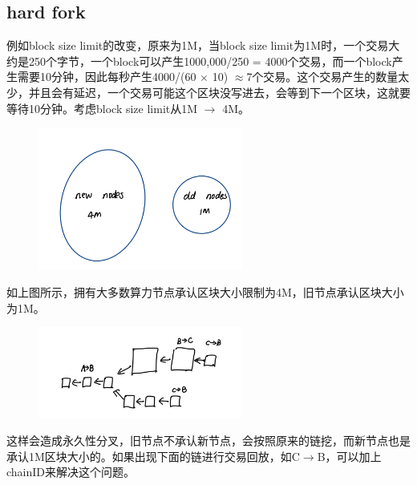 \documentclass[10pt]{ctexart}
\begin{document}
\subsection{hard fork}
例如block size limit的改变，原来为1M，当block size limit为1M时，一个交易大约是250个字节，一个block可以产生1000,000/250 = 4000个交易，而一个block产生需要10分钟，因此每秒产生4000/(60 $\times$ 10) $\approx $7个交易。这个交易产生的数量太少，并且会有延迟，一个交易可能这个区块没写进去，会等到下一个区块，这就要等待10分钟。考虑block size limit从1M $\rightarrow$ 4M。
\begin{figure}[H]
    \centering
    \includegraphics[width=0.6\textwidth]{./lecture10/img1.png} 
\end{figure}
如上图所示，拥有大多数算力节点承认区块大小限制为4M，旧节点承认区块大小为1M。
\begin{figure}[H]
    \centering
    \includegraphics[width=0.6\textwidth]{./lecture10/img2.png} 
\end{figure}
这样会造成永久性分叉，旧节点不承认新节点，会按照原来的链挖，而新节点也是承认1M区块大小的。如果出现下面的链进行交易回放，如C$\rightarrow$B，可以加上chainID来解决这个问题。
\end{document}
